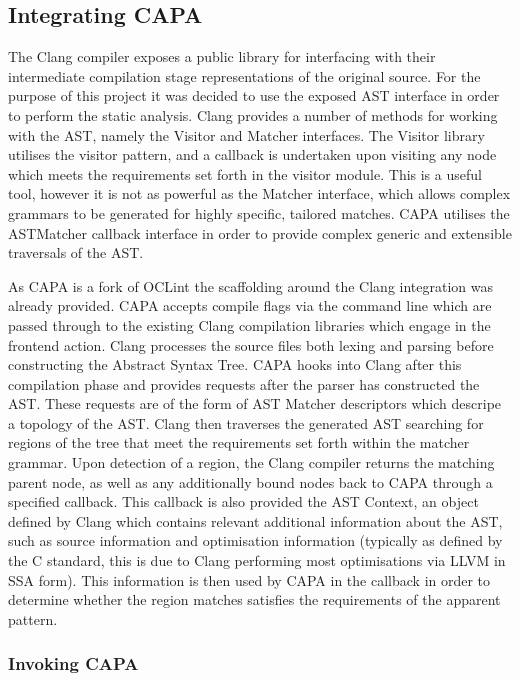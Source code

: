 \subsection{Integrating CAPA}\label{integrating_capa}
The Clang compiler exposes a public library for interfacing with their intermediate
compilation stage representations of the original source. For the purpose of this project it was
decided to use the exposed AST interface in order to perform the static analysis. Clang provides a
number of methods for working with the AST, namely the Visitor and Matcher interfaces. The Visitor
library utilises the visitor pattern, and a callback is undertaken upon visiting any node which
meets the requirements set forth in the visitor module. This is a useful tool, however it is not as
powerful as the Matcher interface, which allows complex grammars to be generated for highly
specific, tailored matches. CAPA utilises the ASTMatcher callback interface in order to provide complex
generic and extensible traversals of the AST. 


As CAPA is a fork of OCLint \cite{oclint} the scaffolding around the Clang integration was already
provided. CAPA accepts compile flags via the command line which are passed through to the existing
Clang compilation libraries which engage in the frontend action. Clang processes the source files
both lexing and parsing before constructing the Abstract Syntax Tree. CAPA hooks into Clang after
this compilation phase and provides requests after the parser has constructed the AST. These
requests are of the form of AST Matcher descriptors which descripe a topology of the AST. Clang then
traverses the generated AST searching for regions of the tree that meet the requirements set forth
within the matcher grammar. Upon detection of a region, the Clang compiler returns the matching
parent node, as well as any additionally bound nodes back to CAPA through a specified callback. This
callback is also provided the AST Context, an object defined by Clang which contains relevant
additional information about the AST, such as source information and optimisation information
(typically as defined by the C standard, this is due to Clang performing most optimisations via LLVM
in SSA form). This information is then used by CAPA in the callback in order to determine whether
the region matches satisfies the requirements of the apparent pattern.

\subsubsection{Invoking CAPA}
